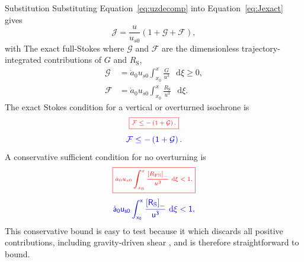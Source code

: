 \documentclass[review]{igs}
\providecommand{\DIFadd}[1]{{\protect\color{blue} \sf #1}} %
\providecommand{\DIFdel}[1]{{\protect\color{red} \scriptsize #1}} %
\providecommand{\DIFaddbegin}{} %
\providecommand{\DIFaddend}{} %
\providecommand{\DIFdelbegin}{} %
\providecommand{\DIFdelend}{} %
\newcommand{\DIFscaledelfig}{0.5}
\newlength{\DIFdelgraphicswidth} %
\newlength{\DIFdelgraphicsheight} %
\newcommand{\DIFaddincludegraphics}[2][]{{\color{blue}\fbox{\DIFOincludegraphics[#1]{#2}}}} %
\newcommand{\DIFdelincludegraphics}[2][]{%
\sbox{\DIFdelgraphicsbox}{\DIFOincludegraphics[#1]{#2}}%
\settoboxwidth{\DIFdelgraphicswidth}{\DIFdelgraphicsbox} %
\settoboxtotalheight{\DIFdelgraphicsheight}{\DIFdelgraphicsbox} %
\scalebox{\DIFscaledelfig}{%
\parbox[b]{\DIFdelgraphicswidth}{\usebox{\DIFdelgraphicsbox}\\[-\baselineskip] \rule{\DIFdelgraphicswidth}{0em}}\llap{\resizebox{\DIFdelgraphicswidth}{\DIFdelgraphicsheight}{%
\setlength{\unitlength}{\DIFdelgraphicswidth}%
\begin{picture}(1,1)%
\thicklines\linethickness{2pt} %
{\color[rgb]{1,0,0}\put(0,0){\framebox(1,1){}}}%
{\color[rgb]{1,0,0}\put(0,0){\line( 1,1){1}}}%
{\color[rgb]{1,0,0}\put(0,1){\line(1,-1){1}}}%
\end{picture}%
}\hspace*{3pt}}} %
} %
\DeclareRobustCommand{\DIFaddbegin}{\DIFOaddbegin \let\includegraphics\DIFaddincludegraphics} %
\DeclareRobustCommand{\DIFaddend}{\DIFOaddend \let\includegraphics\DIFOincludegraphics} %
\DeclareRobustCommand{\DIFdelbegin}{\DIFOdelbegin \let\includegraphics\DIFdelincludegraphics} %
\DeclareRobustCommand{\DIFdelend}{\DIFOaddend \let\includegraphics\DIFOincludegraphics} %
\begin{document}
\DIFdelbegin \DIFdel{Substitution }\DIFdelend \DIFaddbegin \DIFadd{Substituting Equation~\ref{eq:uzdecomp} }\DIFaddend into Equation~\ref{eq:Jexact} gives
\begin{equation}
\mathcal{J}=\frac{u}{u_{s0}}
\left(1+\mathcal{G}+\mathcal{F}\right),
\label{eq:Jfullstokes}
\end{equation}
\DIFdelbegin \DIFdel{with
}%
\DIFdel{The exact full-Stokes }\DIFdelend \DIFaddbegin \DIFadd{where \(\mathcal{G}\) and \(\mathcal{F}\) are the dimensionless trajectory-integrated contributions of \(G\) and \(R_{\mathrm{S}}\),
}\begin{align}
\mathcal{G}&=\dot a_0u_{s0}
\int_{x_0}^{x}\frac{G}{u^3}\,\mathop{}\!\mathrm{d}\xi\geq0,
\label{eq:Ggrav}\\
\mathcal{F}&=\dot a_0u_{s0}
\int_{x_0}^{x}\frac{R_{\mathrm{S}}}{u^3}\,\mathop{}\!\mathrm{d}\xi.
\label{eq:Gfs}
\end{align}
\DIFadd{The exact Stokes }\DIFaddend condition for a vertical or overturned isochrone is
\DIFdelbegin \begin{displaymath}
\DIFdel{\boxed{
\mathcal{F}\leq-\left(1+\mathcal{G}\right).
}
}\end{displaymath}%
\DIFdelend \DIFaddbegin \begin{equation}
\DIFadd{\mathcal{F}\leq-\left(1+\mathcal{G}\right).
\label{eq:FSfailure}
}\end{equation}\DIFaddend 
A conservative sufficient condition for no overturning is
\DIFdelbegin \begin{displaymath}
\DIFdel{\boxed{
\dot a_0u_{s0}
\int_{x_0}^{x}
\frac{\left[R_{\mathrm{FS}}\right]_{-}}{u^3}\,\mathop{}\!\mathrm{d}\xi<1.
}
}\end{displaymath}%
\DIFdelend \DIFaddbegin \begin{equation}
\DIFadd{\dot a_0u_{s0}
\int_{x_0}^{x}
\frac{\left[R_{\mathrm{S}}\right]_{-}}{u^3}\,\mathop{}\!\mathrm{d}\xi<1,
\label{eq:FSsufficient}
}\end{equation}\DIFaddend 
\DIFdelbegin \DIFdel{This conservative bound is easy to test because it }\DIFdelend \DIFaddbegin \DIFadd{which }\DIFaddend discards all positive contributions, including gravity-driven shear\DIFaddbegin \DIFadd{, and is therefore straightforward to bound}\DIFaddend .
\end{document}
